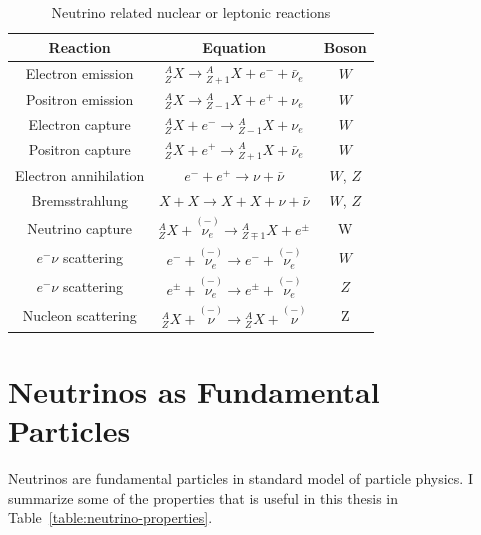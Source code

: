\begin{table}[ht]
\centering
 \begin{tabular}{|c | c | c|} 
 \hline
 Reaction & Equation & Boson   \\ [0.5ex] 
 \hline
 Electron emission & ${}^A_Z X \to {}^A_{Z+1}X + e^- +\bar \nu_e$ & $W$  \\ 
 Positron emission & ${}^A_Z X \to {}^A_{Z-1}X + e^+ + \nu_e$ & $W$  \\
 Electron capture & ${}^A_Z X + e^- \to {}^A_{Z-1}X  + \nu_e$ &  $W$ \\
 Positron capture & ${}^A_Z X + e^+ \to {}^A_{Z+1}X  + \bar\nu_e$ &  $W$ \\
 [0.5ex] 
 \hline

 Electron annihilation &  $e^- + e^+  \to \nu + \bar\nu $  & $W$, $Z$ \\
 Bremsstrahlung & $X+X \to X + X + \nu + \bar\nu$ & $W$, $Z$ \\
 [0.5ex] 
 \hline

  Neutrino capture & ${}^A_{Z}X + \overset{(-)}{\nu_e} \to {}^A_{Z\mp 1}X + e^\pm $ & W\\
  [1ex] 
 \hline
 $e^-\nu$ scattering & $e^- + \overset{(-)}{\nu_e} \to e^- + \overset{(-)}{\nu_e} $ &  $W$ \\
 $e^-\nu$ scattering & $e^{\pm} + \overset{(-)}{\nu_e} \to e^{\pm} + \overset{(-)}{\nu_e} $ &  $Z$ \\
 Nucleon scattering & $ {}^A_Z X + \overset{(-)}{\nu} \to {}^A_Z X + \overset{(-)}{\nu} $ &  Z\\
 [0.5ex] 
 \hline
 \end{tabular}
 \caption{Neutrino related nuclear or leptonic reactions}
\label{table:Neutrino_Reactions}
\end{table}





\section{\label{chap:basics-section:neutrinos}Neutrinos as Fundamental Particles}

Neutrinos are fundamental particles in standard model of particle physics. I summarize some of the properties that is useful in this thesis in Table~\ref{table:neutrino-properties}.

